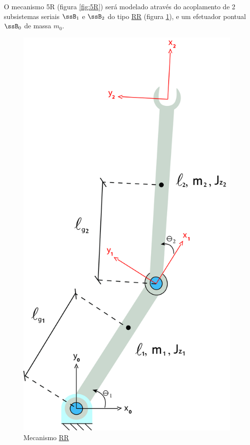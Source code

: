 \documentclass[]{politex}
\begin{document}
O mecanismo 5R (figura \ref{fig:5R}) será modelado através do acoplamento de 2 subsistemas seriais $\ssB_1$ e $\ssB_2$ do tipo \underline{R}\underline{R} (figura \ref{fig:RR}), e um efetuador pontual $\ssB_0$ de massa $m_0$.

\begin{figure}[h]
	\centering
	\includegraphics[scale=0.055]{../figures/RR.jpg}  
	\caption{Mecanismo \underline{R}\underline{R}}
	\label{fig:RR}
\end{figure}
\end{document}
